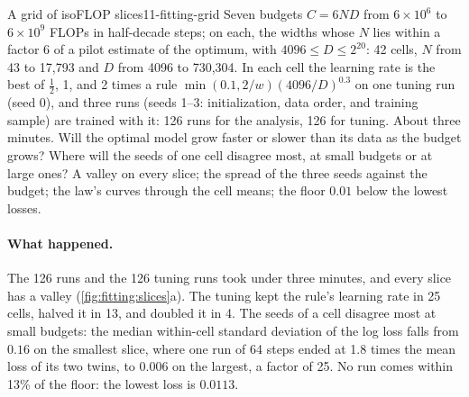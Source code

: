 \begin{refsection}
\begin{lab}{A grid of isoFLOP slices}{11-fitting-grid}\label{lab:fitting:grid}
 Seven budgets $C=6ND$ from $6\times10^{6}$ to $6\times10^{9}$ FLOPs in half-decade steps; on each, the widths whose $N$ lies within a factor 6 of a pilot estimate of the optimum, with $4096\le D\le2^{20}$: 42 cells, $N$ from 43 to 17,793 and $D$ from 4096 to 730,304. In each cell the learning rate is the best of $\frac12$, 1, and 2 times a rule $\min(0.1,2/w)(4096/D)^{0.3}$ on one tuning run (seed 0), and three runs (seeds 1--3: initialization, data order, and training sample) are trained with it: 126 runs for the analysis, 126 for tuning. About three minutes.
 Will the optimal model grow faster or slower than its data as the budget grows? Where will the seeds of one cell disagree most, at small budgets or at large ones?
 A valley on every slice; the spread of the three seeds against the budget; the law's curves through the cell means; the floor $0.01$ below the lowest losses.
\end{lab}

\paragraph{What happened.} The 126 runs and the 126 tuning runs took under three minutes, and every slice has a valley (\cref{fig:fitting:slices}a). The tuning kept the rule's learning rate in 25 cells, halved it in 13, and doubled it in 4. The seeds of a cell disagree most at small budgets: the median within-cell standard deviation of the log loss falls from $0.16$ on the smallest slice, where one run of 64 steps ended at 1.8 times the mean loss of its two twins, to $0.006$ on the largest, a factor of 25. No run comes within 13\% of the floor: the lowest loss is $0.0113$.


\end{refsection}
